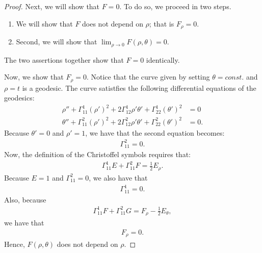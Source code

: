 \documentclass[10pt]{article}
\newcommand{\ra}{\rightarrow}
\begin{document}
\begin{itemize}
\begin{proof}
      Next, we will show that $F = 0$. To do so, we proceed in two steps.
      \begin{enumerate}
        \item We will show that $F$ does not depend on $\rho$; that is $F_\rho = 0$.
        \item Second, we will show that $\lim_{\rho \ra 0} F(\rho, \theta) = 0$.
      \end{enumerate}
      The two assertions together show that $F = 0$ identically.

      Now, we show that $F_\rho = 0$. Notice that the curve given by setting $\theta = const.$ and $\rho = t$ is a geodesic. The curve satistfies the following differential equations of the geodesics:
      \begin{align*}
        \rho'' + \Gamma_{11}^1 (\rho')^2 + 2\Gamma_{12}^1 \rho'\theta' + \Gamma_{22}^1(\theta')^2 &= 0\\
        \theta'' + \Gamma_{11}^2(\rho')^2 + 2\Gamma_{12}^2 \rho' \theta' + \Gamma_{22}^2 (\theta')^2 &= 0.
      \end{align*}
      Because $\theta' = 0$ and $\rho' = 1$, we have that the second equation becomes:
      \begin{align*}
        \Gamma_{11}^2 = 0.
      \end{align*}
      Now, the definition of the Christoffel symbols requires that:
      \begin{align*}
        \Gamma_{11}^1 E + \Gamma_{11}^2 F = \frac{1}{2}E_{\rho}.
      \end{align*}
      Because $E = 1$ and $\Gamma_{11}^2 = 0$, we also have that
      \begin{align*}
        \Gamma_{11}^1 = 0.
      \end{align*}
      Also, because
      \begin{align*}
        \Gamma_{11}^1 F + \Gamma_{11}^2 G = F_\rho - \frac{1}{2}E_\theta,
      \end{align*}
      we have that
      \begin{align*}
        F_\rho = 0.
      \end{align*}
      Hence, $F(\rho,\theta)$ does not depend on $\rho$.


\end{proof}
\end{itemize}
\end{document}
